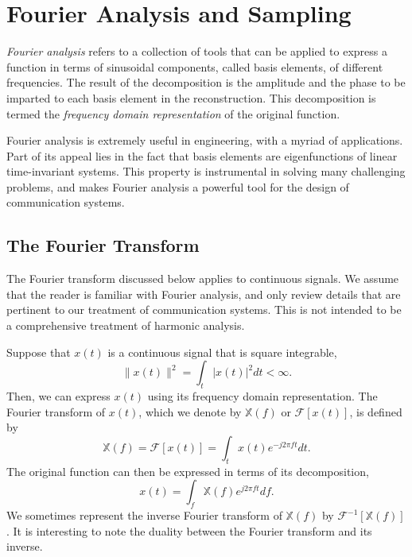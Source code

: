 \chapter{Fourier Analysis and Sampling}
\label{chapter:FourierAnalysisSampling}

\emph{Fourier analysis} refers to a collection of tools that can be applied to express a function in terms of sinusoidal components, called basis elements, of different frequencies.
The result of the decomposition is the amplitude and the phase to be imparted to each basis element in the reconstruction.
This decomposition is termed the \emph{frequency domain representation} of the original function.

Fourier analysis is extremely useful in engineering, with a myriad of applications.
Part of its appeal lies in the fact that basis elements are eigenfunctions of linear time-invariant systems.
This property is instrumental in solving many challenging problems, and makes Fourier analysis a powerful tool for the design of communication systems.


\section{The Fourier Transform}

The Fourier transform discussed below applies to continuous signals.
We assume that the reader is familiar with Fourier analysis, and only review details that are pertinent to our treatment of communication systems.
This is not intended to be a comprehensive treatment of harmonic analysis.

Suppose that $x(t)$ is a continuous signal that is square integrable,
\begin{equation} \label{equation:L2Condition}
\| x(t) \|^2 = \int_t | x(t) |^2 dt < \infty .
\end{equation}
Then, we can express $x(t)$ using its frequency domain representation.
The Fourier transform of $x(t)$, which we denote by $\mathbb{X}(f)$ or $\mathcal{F} [x(t)]$, is defined by
\begin{equation} \label{equation:FourierTransform}
\mathbb{X}(f) = \mathcal{F} [x(t)]
= \int_t x(t) e^{-j 2 \pi f t} dt .
\end{equation}
The original function can then be expressed in terms of its decomposition,
\begin{equation} \label{equation:InverseFourierTransform}
x(t) = \int_f \mathbb{X}(f) e^{j 2 \pi f t} df .
\end{equation}
We sometimes represent the inverse Fourier transform of $\mathbb{X}(f)$ by $\mathcal{F}^{-1} [\mathbb{X}(f)]$.
It is interesting to note the duality between the Fourier transform and its inverse.

